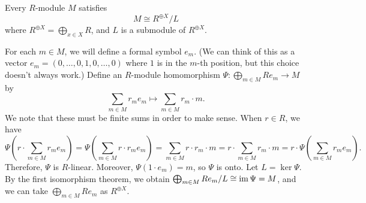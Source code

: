 \begin{prop}
    Every $R$-module $M$ satisfies 
    \[ M \cong R^{\oplus X}/L \] 
    where $R^{\oplus X} = \bigoplus_{x \in X} R$, and $L$ is a submodule of 
    $R^{\oplus X}$. 
\end{prop}
\begin{pf}
    For each $m \in M$, we will define a formal symbol $e_m$. 
    (We can think of this as a vector $e_m = (0, \dots, 0, 1, 0, \dots, 0)$ 
    where $1$ is in the $m$-th position, but this choice doesn't always work.)
    Define an $R$-module homomorphism $\Psi : \bigoplus_{m \in M} Re_m \to M$ by 
    \[ \sum_{m \in M} r_m e_m \mapsto \sum_{m \in M} r_m \cdot m. \] 
    We note that these must be finite sums in order to make sense. When $r \in R$, 
    we have 
    \[ \Psi\left(r \cdot \sum_{m \in M} r_m e_m \right) 
        = \Psi\left( \sum_{m \in M} r \cdot r_m e_m \right) 
        = \sum_{m \in M} r \cdot r_m \cdot m 
        = r \cdot \sum_{m \in M} r_m \cdot m 
        = r \cdot \Psi \left( \sum_{m \in M} r_m e_m \right). \] 
    Therefore, $\Psi$ is $R$-linear. Moreover, $\Psi(1 \cdot e_m) = m$, so 
    $\Psi$ is onto. Let $L = \ker\Psi$. By the first isomorphism theorem, 
    we obtain $\bigoplus_{m \in M} Re_m/L \cong \operatorname{im}\Psi = M$, 
    and we can take  $\bigoplus_{m \in M} Re_m$ as $R^{\oplus X}$. 
\end{pf}